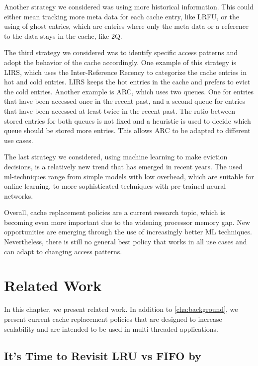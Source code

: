 \documentclass[
	12pt,
	a4paper,
	abstract,
	bibliography=totoc,
	chapterprefix,
	headings=openright,
	numbers=endperiod,
	parskip=half,
	twoside,
]{scrreprt}
\begin{document}
Another strategy we considered was using more historical information.
This could either mean tracking more meta data for each cache entry, like LRFU, or the using
of ghost entries, which are entries where only the meta data or a reference to the data stays in the cache, like 2Q.

The third strategy we considered was to identify specific access patterns and adopt the behavior of the cache accordingly.
One example of this strategy is LIRS, which uses the Inter-Reference Recency to categorize 
the cache entries in hot and cold entries.
LIRS keeps the hot entries in the cache and prefers to evict the cold entries.
Another example is ARC, which uses two queues.
One for entries that have been accessed once in the recent past, and a 
second queue for entries that have been accessed at least twice in the recent past.
The ratio between stored entries for both queues is not fixed and a heuristic is used to decide which 
queue should be stored more entries.
This allows ARC to be adapted to different use cases.

The last strategy we considered, using machine learning to make eviction decisions, 
is a relatively new trend that has emerged in recent years.
The used ml-techniques range from simple models with low overhead, which are suitable for online learning, to
more sophisticated techniques with pre-trained neural networks.

Overall, cache replacement policies are a current research topic, which is becoming even more important 
due to the widening processor memory gap.
New opportunities are emerging through the use of increasingly better ML techniques.
Nevertheless, there is still no general best policy that works in all use cases and can adapt to changing access patterns.

\chapter{Related Work}
\label{cha:related work}

In this chapter, we present related work.
In addition to \cref{cha:background}, we present current cache replacement policies that are designed to increase scalability 
and are intended to be used in multi-threaded applications.

\section*{It's Time to Revisit LRU vs FIFO by \cite{eytan2020s}}
\end{document}
